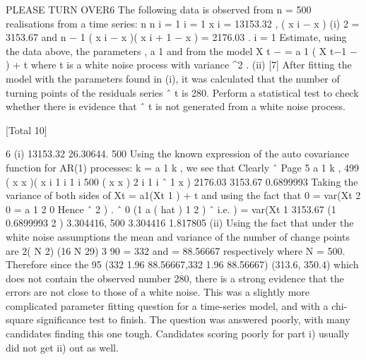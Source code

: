\documentclass[a4paper,12pt]{article}
\begin{document}
PLEASE TURN OVER6
The following data is observed from n = 500 realisations from a time series:
n n
i = 1 i = 1
\sum x i = 13153.32 , \sum ( x i − x )
(i)
2
= 3153.67 and
n − 1
\sum ( x i − x )( x i + 1 − x ) = 2176.03 .
i = 1
Estimate, using the data above, the parameters \mu , a 1 and \sigma  from the model
X t − \mu = a 1 ( X t−1 − \mu ) + \varepsilon t
where \varepsilon t is a white noise process with variance \sigma^2  .
(ii)
[7]
After fitting the model with the parameters found in (i), it was calculated that
the number of turning points of the residuals series \varepsilon ˆ t is 280.
Perform a statistical test to check whether there is evidence that \varepsilon ˆ t is not
generated from a white noise process.

[Total 10]

6
(i)
13153.32
26.30644.
500
Using the known expression of the auto covariance function for AR(1)
processes: k = a 1 k , we see that
Clearly ˆ
Page 5%
a 1 k ,
499
( x x )( x i 1
i 1 i
500
( x x ) 2
i 1 i
ˆ 1
x )
2176.03
3153.67
0.6899993
Taking the variance of both sides of
Xt
= a1(Xt 1
) + t
and using the fact that 0 = var(Xt
2
0 = a 1
2
0
Hence ˆ 2
)
.
ˆ 0 (1 a ( hat ) 1 2 )
ˆ
i.e.
) = var(Xt 1
3153.67
(1 0.6899993 2 ) 3.304416,
500
3.304416 1.817805
(ii) Using the fact that under the white noise assumptions the mean and
variance of the number of change points are
2( N 2)
(16 N 29)
3
90
= 332 and
= 88.56667
respectively where N = 500. Therefore since the 95%
(332 1.96
88.56667,332 1.96
88.56667) (313.6, 350.4)
which does not contain the observed number 280, there is a strong evidence
that the errors are not close to those of a white noise.
This was a slightly more complicated parameter fitting question for a time-series
model, and with a chi-square significance test to finish. The question was answered
poorly, with many candidates finding this one tough. Candidates scoring poorly for
part i) usually did not get ii) out as well.

\end{document}

